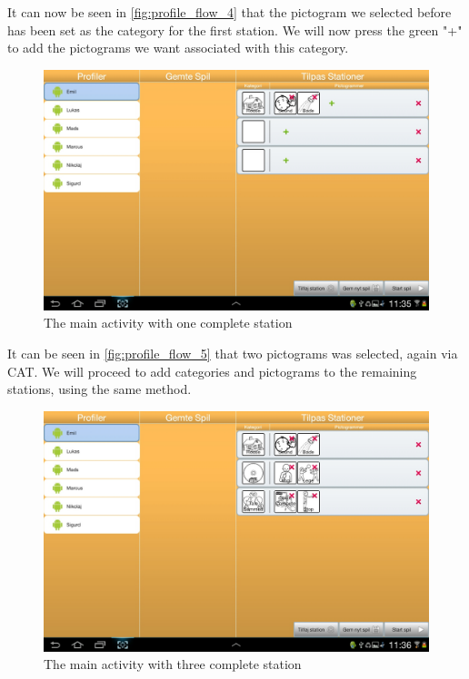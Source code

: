 It can now be seen in \autoref{fig:profile_flow_4} that the pictogram we selected before has been set as the category for the first station. We will now press the green "+" to add the pictograms we want associated with this category.

\begin{figure}[H]
\centering
\includegraphics[width=0.9\linewidth]{img/screenshots/profile_flow_5.jpg}%
\caption{The main activity with one complete station}
\label{fig:profile_flow_5}
\end{figure}

It can be seen in \autoref{fig:profile_flow_5} that two pictograms was selected, again via CAT.  We will proceed to add categories and pictograms to the remaining stations, using the same method.

\begin{figure}[H]
\centering
\includegraphics[width=0.9\linewidth]{img/screenshots/profile_flow_6.jpg}%
\caption{The main activity with three complete station}
\label{fig:profile_flow_6}
\end{figure}

